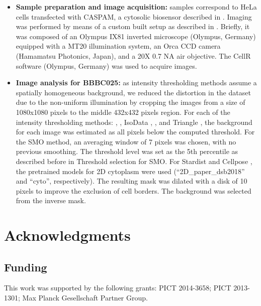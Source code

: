\documentclass[article]{jss}
\begin{document}
\begin{itemize}
\item	\textbf{Sample preparation and image acquisition:} samples correspond to HeLa cells transfected with CASPAM, a cytosolic biosensor described in \cite{Habif2021}. Imaging was performed by means of a custom built setup as described in \cite{Squire2004, Vilar2009}. Briefly, it was composed of an Olympus IX81 inverted microscope (Olympus, Germany) equipped with a MT20 illumination system, an Orca CCD camera (Hamamatsu Photonics, Japan), and a 20X 0.7 NA air objective. The CellR software (Olympus, Germany) was used to acquire images.

\item	\textbf{Image analysis for BBBC025:} as intensity thresholding methods assume a spatially homogeneous background, we reduced the distortion in the dataset due to the non-uniform illumination by cropping the images from a size of 1080x1080 pixels to the middle 432x432 pixels region. For each of the intensity thresholding methods: \cite{Otsu1979}, \cite{Yen1995}, IsoData \citep{Ridler1978}, \citep{Li1993}, and Triangle \citep{Zack1977}, the background for each image was estimated as all pixels below the computed threshold. For the SMO method, an averaging window of 7 pixels was chosen, with no previous smoothing. The threshold level was set as the 5th percentile as described before in Threshold selection for SMO. For Stardist \citep{Schmidt2018} and Cellpose \citep{Stringer2021}, the pretrained models for 2D cytoplasm were used (``2D\_paper\_dsb2018'' and ``cyto'', respectively). The resulting mask was dilated with a disk of 10 pixels to improve the exclusion of cell borders. The background was selected from the inverse mask.

\end{itemize}

\section*{Acknowledgments}

\subsection{Funding}

	This work was supported by the following grants: PICT 2014-3658; PICT 2013-1301; Max Planck Gesellschaft Partner Group.


\end{document}
